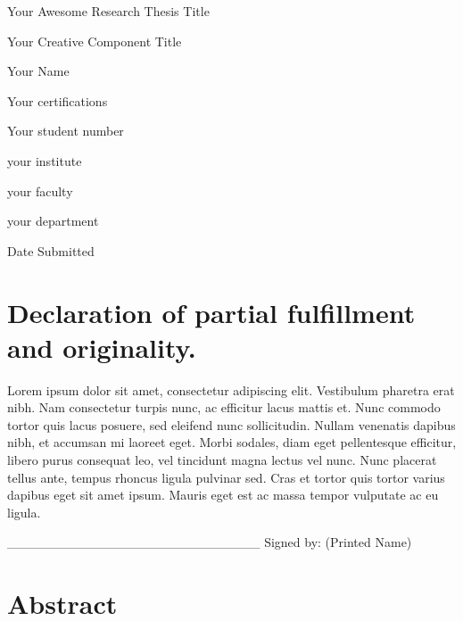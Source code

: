 \documentclass[a4paper]{memoir}
\begin{document}
\frontmatter

\begin{center}
    \large{Your Awesome Research Thesis Title}

    \large{Your Creative Component Title}


\vspace{3cm}

Your Name

Your certifications

Your student number

\vspace{3cm}

your institute

your faculty

your department

Date Submitted

\end{center}





\pagebreak


\chapter*{Declaration of partial fulfillment and originality.}
\label{declarationofpartialfulfillmentandoriginality.}

Lorem ipsum dolor sit amet, consectetur adipiscing elit. Vestibulum pharetra erat nibh. Nam consectetur turpis nunc, ac efficitur lacus mattis et. Nunc commodo tortor quis lacus posuere, sed eleifend nunc sollicitudin. Nullam venenatis dapibus nibh, et accumsan mi laoreet eget. Morbi sodales, diam eget pellentesque efficitur, libero purus consequat leo, vel tincidunt magna lectus vel nunc. Nunc placerat tellus ante, tempus rhoncus ligula pulvinar sed. Cras et tortor quis tortor varius dapibus eget sit amet ipsum. Mauris eget est ac massa tempor vulputate ac eu ligula. 

\_\_\_\_\_\_\_\_\_\_\_\_\_\_\_\_\_\_\_\_\_\_\_\_\_\_\_
Signed by: (Printed Name)

\chapter*{Abstract}
\label{abstract}
\end{document}
